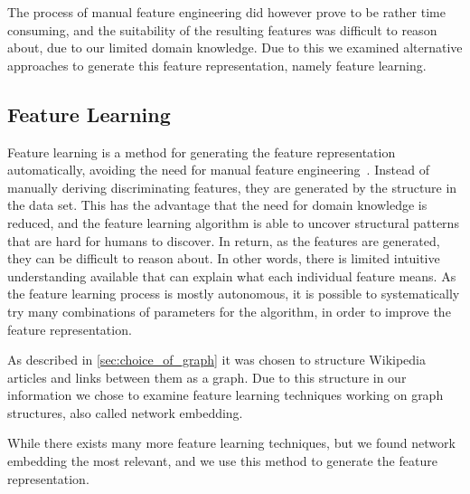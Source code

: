 The process of manual feature engineering did however prove to be rather time consuming, and the suitability of the resulting features was difficult to reason about, due to our limited domain knowledge. Due to this we examined alternative approaches to generate this feature representation, namely feature learning.

\subsection{Feature Learning}
Feature learning is a method for generating the feature representation automatically, avoiding the need for manual feature engineering~\cite{ng-lecture}. Instead of manually deriving discriminating features, they are generated by the structure in the data set. This has the advantage that the need for domain knowledge is reduced, and the feature learning algorithm is able to uncover structural patterns that are hard for humans to discover. In return, as the features are generated, they can be difficult to reason about. In other words, there is limited intuitive understanding available that can explain what each individual feature means. As the feature learning process is mostly autonomous, it is possible to systematically try many combinations of parameters for the algorithm, in order to improve the feature representation.

As described in \cref{sec:choice_of_graph} it was chosen to structure Wikipedia articles and links between them as a graph. Due to this structure in our information we chose to examine feature learning techniques working on graph structures, also called network embedding.

While there exists many more feature learning techniques, but we found network embedding the most relevant, and we use this method to generate the feature representation.
